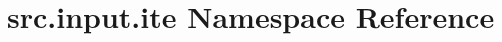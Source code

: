 \hypertarget{namespacesrc_1_1input_1_1ite}{\section{src.\+input.\+ite Namespace Reference}
\label{namespacesrc_1_1input_1_1ite}
}
